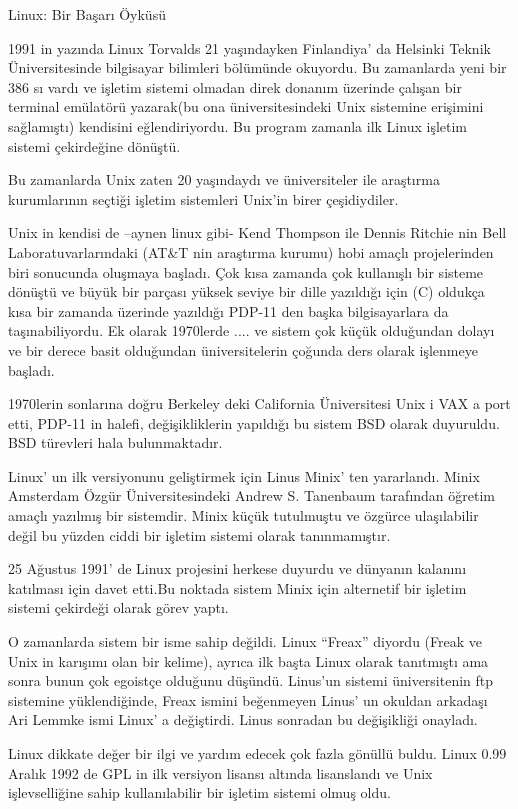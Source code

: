 \documentclass[10pt,a5paper]{book}
\begin{document}
\begin{section}{Linux: Bir Başarı Öyküsü}

1991 in yazında Linux Torvalds 21 yaşındayken Finlandiya’ da Helsinki Teknik Üniversitesinde bilgisayar bilimleri bölümünde okuyordu. Bu zamanlarda yeni bir 386 sı vardı ve işletim sistemi olmadan direk donanım üzerinde çalışan bir terminal emülatörü yazarak(bu ona üniversitesindeki Unix sistemine erişimini sağlamıştı) kendisini eğlendiriyordu.  Bu program zamanla ilk Linux işletim sistemi çekirdeğine dönüştü.

Bu zamanlarda Unix zaten 20 yaşındaydı ve üniversiteler ile araştırma kurumlarının seçtiği işletim sistemleri Unix'in birer çeşidiydiler.

Unix in kendisi de –aynen linux gibi- Kend Thompson ile Dennis Ritchie nin Bell Laboratuvarlarındaki (AT\&T nin araştırma kurumu) hobi amaçlı projelerinden biri sonucunda oluşmaya başladı. Çok kısa zamanda çok kullanışlı bir sisteme dönüştü ve büyük bir parçası yüksek seviye bir dille yazıldığı için (C) oldukça kısa bir zamanda üzerinde yazıldığı PDP-11 den başka bilgisayarlara da taşınabiliyordu. Ek olarak 1970lerde .... ve sistem çok küçük olduğundan dolayı ve bir derece basit olduğundan üniversitelerin çoğunda ders olarak işlenmeye başladı.

1970lerin sonlarına doğru Berkeley deki California Üniversitesi Unix i VAX a port etti, PDP-11 in halefi, değişikliklerin yapıldığı bu sistem BSD olarak duyuruldu. BSD türevleri hala bulunmaktadır.

Linux’ un ilk versiyonunu geliştirmek için Linus Minix’ ten yararlandı. Minix Amsterdam Özgür Üniversitesindeki Andrew S. Tanenbaum tarafından öğretim amaçlı yazılmış bir sistemdir. Minix küçük tutulmuştu ve özgürce ulaşılabilir değil bu yüzden ciddi bir işletim sistemi olarak tanınmamıştır.

25 Ağustus 1991’ de Linux projesini herkese duyurdu ve dünyanın kalanını katılması için davet etti.Bu noktada sistem Minix için alternetif bir işletim sistemi çekirdeği olarak görev yaptı.

O zamanlarda sistem bir isme sahip değildi. Linux “Freax” diyordu (Freak ve Unix in karışımı olan bir kelime), ayrıca ilk başta Linux olarak tanıtmıştı ama sonra bunun çok egoistçe olduğunu düşündü. Linus’un sistemi üniversitenin ftp sistemine yüklendiğinde, Freax ismini beğenmeyen Linus’ un okuldan arkadaşı Ari Lemmke ismi Linux’ a değiştirdi. Linus sonradan bu değişikliği onayladı.

Linux dikkate değer bir ilgi ve yardım edecek çok fazla gönüllü buldu. Linux 0.99 Aralık 1992 de GPL in ilk versiyon lisansı altında lisanslandı ve Unix işlevselliğine sahip kullanılabilir bir işletim sistemi olmuş oldu.


\end{section}
\end{document}
